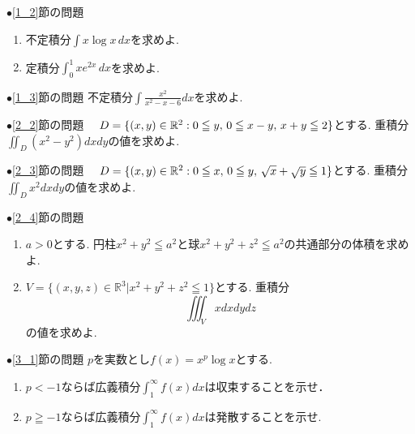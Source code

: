 \documentclass[dvipdfmx,a4paper,11pt]{article}
\newcommand{\R}{\mathbb{R}}
\theoremstyle{definition}
\begin{document}
$\bullet$\ref{1_2}節の問題
\begin{enumerate}
    \setlength{\parskip}{0cm} 
  \setlength{\itemsep}{0cm} 
\item 不定積分$\int x\log x \,dx$を求めよ.
\item 定積分$\int_{0}^{1} x  e^{2x} \,dx$を求めよ.
\end{enumerate}

\hspace{-18pt}$\bullet$\ref{1_3}節の問題
\hspace{11pt}不定積分$\int \frac{x^2}{x^2 - x - 6}dx$を求めよ.

\hspace{-18pt}$\bullet$\ref{2_2}節の問題
　$D=\{ (x,y) \in \R^2 : 0 \leqq y, \text{\,} 0 \leqq x-y, \text{\,} x+y \leqq 2\}$とする.
重積分$\iint_{D} (x^2-y^2)dxdy$の値を求めよ.

\hspace{-18pt}$\bullet$\ref{2_3}節の問題
　$D=\{ (x,y) \in \R^2 : 0 \leqq x, \text{\,}  0 \leqq y,\text{\,} \sqrt{x} + \sqrt{y} \leqq 1\}$とする.
重積分$\iint_{D} x^2dxdy$の値を求めよ.

\hspace{-18pt}$\bullet$\ref{2_4}節の問題
\begin{enumerate}
    \setlength{\parskip}{0cm} 
  \setlength{\itemsep}{0cm} 
\item $a>0$とする. 円柱$x^2 + y^2 \leqq a^2$と球$x^2 + y^2 + z^2 \leqq a^2$の共通部分の体積を求めよ.
\item$ V = \{ (x,y,z) \in \R^3 | x^2 + y^2 + z^2 \leqq 1\}$とする. 重積分
$$
\iiint_{V} x dxdydz
$$
の値を求めよ.
\end{enumerate}

\hspace{-18pt}$\bullet$\ref{3_1}節の問題 
\hspace{11pt}$p$を実数とし$f(x) = x^p \log x$とする.
\begin{enumerate}
    \setlength{\parskip}{0cm} 
  \setlength{\itemsep}{0cm} 
\item $p< -1$ならば広義積分$\int_{1}^{\infty} f(x) dx$は収束することを示せ．
\item $p\geqq -1$ならば広義積分$\int_{1}^{\infty} f(x) dx$は発散することを示せ.
\end{enumerate}

 
 
\end{document}
